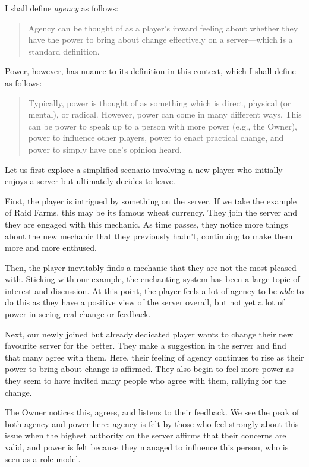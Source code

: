 I shall define \emph{agency} as follows:
\begin{quote}
    Agency can be thought of as a player’s inward feeling about whether they have the power to bring about change effectively on a server—which is a standard definition.
\end{quote}
Power, however, has nuance to its definition in this context, which I shall define as follows:
\begin{quote}
    Typically, power is thought of as something which is direct, physical (or mental), or radical. However, power can come in many different ways. This can be power to speak up to a person with more power (e.g., the Owner), power to influence other players, power to enact practical change, and power to simply have one’s opinion heard.
\end{quote}
Let us first explore a simplified scenario involving a new player who initially enjoys a server but ultimately decides to leave.

First, the player is intrigued by something on the server. If we take the example of Raid Farms, this may be its famous wheat currency. They join the server and they are engaged with this mechanic. As time passes, they notice more things about the new mechanic that they previously hadn’t, continuing to make them more and more enthused.

Then, the player inevitably finds a mechanic that they are not the most pleased with. Sticking with our example, the enchanting system has been a large topic of interest and discussion. At this point, the player feels a lot of agency to be \emph{able} to do this as they have a positive view of the server overall, but not yet a lot of power in seeing real change or feedback.

Next, our newly joined but already dedicated player wants to change their new favourite server for the better. They make a suggestion in the server and find that many agree with them. Here, their feeling of agency continues to rise as their power to bring about change is affirmed. They also begin to feel more power as they seem to have invited many people who agree with them, rallying for the change.

The Owner notices this, agrees, and listens to their feedback. We see the peak of both agency and power here: agency is felt by those who feel strongly about this issue when the highest authority on the server affirms that their concerns are valid, and power is felt because they managed to influence this person, who is seen as a role model.

